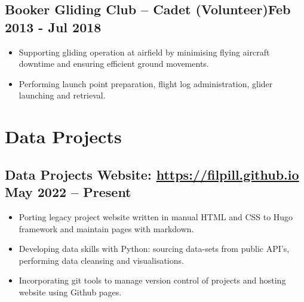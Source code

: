 \documentclass[a4paper,9pt]{article}
\begin{document}
\subsection*{\textbf{Booker Gliding Club – Cadet (Volunteer)}\hfill Feb 2013 - Jul 2018}
\begin{itemize}[noitemsep]

	\item Supporting gliding operation at airfield by minimising flying aircraft downtime and ensuring efficient ground movements.
	\item Performing launch point preparation, flight log administration, glider launching and retrieval.

\end{itemize}


\section*{Data Projects}

\subsection*{\textbf{Data Projects Website}: \url{https://filpill.github.io} \hfill  May 2022 – Present}
\begin{itemize}[noitemsep]

	\item  Porting legacy project website written in manual HTML and CSS to Hugo framework and maintain pages with markdown.
	\item  Developing data skills with Python: sourcing data-sets from public API's, performing data cleansing and visualisations.
	\item  Incorporating git tools to manage version control of projects and hosting website using Github pages.

\end{itemize}

%
%
\end{document}
